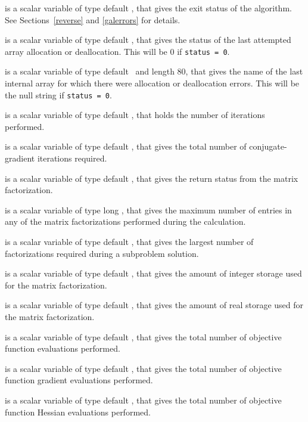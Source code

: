 \documentclass{galahad}
\begin{document}
\begin{description}
 is a scalar variable of type default \integer, that gives the
exit status of the algorithm.
See Sections~\ref{reverse} and \ref{galerrors}
for details.

 is a scalar variable of type default \integer, that gives
the status of the last attempted array allocation or deallocation.
This will be 0 if {\tt status = 0}.

 is a scalar variable of type default \character\
and length 80, that  gives the name of the last internal array
for which there were allocation or deallocation errors.
This will be the null string if {\tt status = 0}.

 is a scalar variable of type default \integer, that holds the
number of iterations performed.

 is a scalar variable of type default \integer, that gives the
total number of conjugate-gradient iterations required.

 is a scalar variable of type default \integer, that
gives the return status from the matrix factorization.

 is a scalar variable of type long \integer, that
gives the maximum number of entries in any of the matrix factorizations
performed during the calculation.

 is a scalar variable of type default \integer, that
gives the largest number of factorizations required during a subproblem
solution.

 is a scalar variable of type default
\integer, that gives the amount of integer storage used for the matrix
factorization.

 is a scalar variable of type default \integer,
that gives the amount of real storage used for the matrix factorization.

 is a scalar variable of type default \integer, that gives the
total number of objective function evaluations performed.

 is a scalar variable of type default \integer, that gives the
total number of objective function gradient evaluations performed.

 is a scalar variable of type default \integer, that gives the
total number of objective function Hessian evaluations performed.


\end{description}
\end{document}

